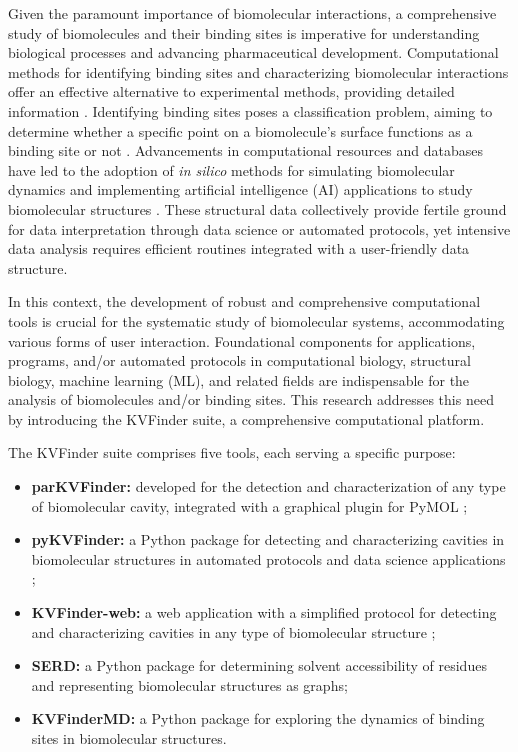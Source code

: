 \documentclass[Ingles]{phdthesis}
\begin{document}
Given the paramount importance of biomolecular interactions, a comprehensive study of biomolecules and their binding sites is imperative for understanding biological processes and advancing pharmaceutical development. Computational methods for identifying binding sites and characterizing biomolecular interactions offer an effective alternative to experimental methods, providing detailed information \cite{simoes2017}. Identifying binding sites poses a classification problem, aiming to determine whether a specific point on a biomolecule's surface functions as a binding site or not \cite{sotriffer2002,henrich2010,simoes2017}. Advancements in computational resources and databases have led to the adoption of \textit{in silico} methods for simulating biomolecular dynamics and implementing artificial intelligence (AI) applications to study biomolecular structures \cite{tunyasuvunakool2021}. These structural data collectively provide fertile ground for data interpretation through data science or automated protocols, yet intensive data analysis requires efficient routines integrated with a user-friendly data structure.

In this context, the development of robust and comprehensive computational tools is crucial for the systematic study of biomolecular systems, accommodating various forms of user interaction. Foundational components for applications, programs, and/or automated protocols in computational biology, structural biology, machine learning (ML), and related fields are indispensable for the analysis of biomolecules and/or binding sites. This research addresses this need by introducing the KVFinder suite, a comprehensive computational platform.

The KVFinder suite comprises five tools, each serving a specific purpose:

\begin{itemize}
  \item \textbf{parKVFinder:} developed for the detection and characterization of any type of biomolecular cavity, integrated with a graphical plugin for PyMOL \cite{guerra2019,guerra2020};
  \item \textbf{pyKVFinder:} a Python package for detecting and characterizing cavities in biomolecular structures in automated protocols and data science applications \cite{guerra2021};
  \item \textbf{KVFinder-web:} a web application with a simplified protocol for detecting and characterizing cavities in any type of biomolecular structure \cite{guerra2023A};
  \item \textbf{SERD:} a Python package for determining solvent accessibility of residues and representing biomolecular structures as graphs;
  \item \textbf{KVFinderMD:} a Python package for exploring the dynamics of binding sites in biomolecular structures.
\end{itemize}
\end{document}
